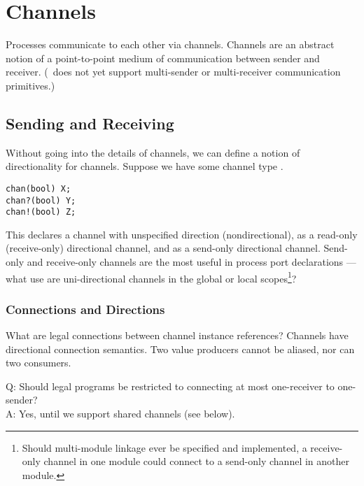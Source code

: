 

\chapter{Channels}
\label{sec:channels}

Processes communicate to each other via channels.  
Channels are an abstract notion of a point-to-point medium
of communication between sender and receiver.
(\hac\ does not yet support multi-sender or multi-receiver communication
primitives.)  

\section{Sending and Receiving}
\label{sec:channel:sendrecv}

Without going into the details of channels, we can define a notion of 
directionality for channels.  
Suppose we have some channel type .  

\begin{verbatim}
chan(bool) X;
chan?(bool) Y;
chan!(bool) Z;
\end{verbatim}

This declares a channel  with unspecified direction (nondirectional), 
 as a read-only (receive-only) directional channel, 
and  as a send-only directional channel.  
Send-only and receive-only channels are the most useful in
process port declarations ---
what use are uni-directional channels in the global or local 
scopes\footnote{Should multi-module linkage ever be specified and implemented, 
a receive-only channel in one module could connect to 
a send-only channel in another module.}?

\subsection{Connections and Directions}
\label{sec:channel:sendrecv:connect}

What are legal connections between channel instance references?
Channels have directional connection semantics.
Two value producers cannot be aliased, nor can two consumers.  

Q: Should legal programs be restricted to connecting
at most one-receiver to one-sender?\\
A: Yes, until we support shared channels (see below).

